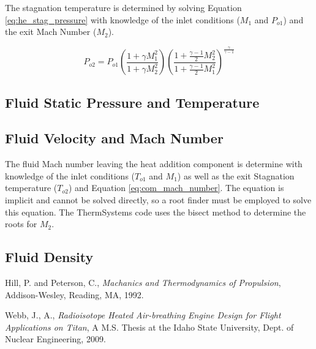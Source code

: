 The stagnation temperature is determined by solving Equation \ref{eq:he_stag_pressure} with knowledge of the inlet conditions 
($M_1$ and $P_{o1}$) and the exit Mach Number ($M_2$).

\begin{equation}
\label{eq:he_stag_pressure}
P_{o2} = P_{o1}\left(\frac{1 + \gamma M^2_1}{1 + \gamma M^2_2} \right) \left(\frac{1 + \frac{\gamma - 1}{2}M^2_2}{1 + \frac{\gamma -1}{2}M^2_1} \right)^{\frac{\gamma}{\gamma - 1}}
\end{equation}

\subsection{Fluid Static Pressure and Temperature}

\subsection{Fluid Velocity and Mach Number}
The fluid Mach number leaving the heat addition component is determine with knowledge of the inlet conditions ($T_{o1}$ and $M_1$) as
well as the exit Stagnation temperature ($T_{o2}$) and Equation \ref{eq:com_mach_number}.  The equation is implicit and cannot be solved
directly, so a root finder must be employed to solve this equation.  The ThermSystems code uses the bisect method to determine the roots
for $M_2$.

\subsection{Fluid Density}


\begin{thebibliography}{2}

 Hill, P. and Peterson, C., \emph{Machanics and Thermodynamics of Propulsion}, Addison-Wesley, Reading, MA, 1992.

 Webb, J., A., \emph{Radioisotope Heated Air-breathing Engine Design for Flight Applications on Titan}, A M.S. Thesis at
                         the Idaho State University, Dept. of Nuclear Engineering, 2009.
\end{thebibliography}